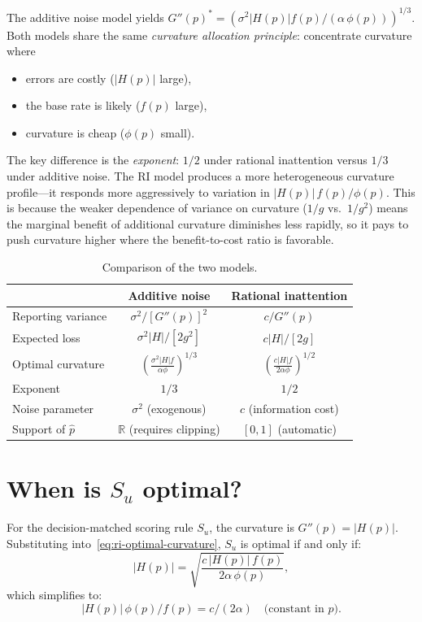 \documentclass[11pt]{article}
\begin{document}
The additive noise model yields $G''(p)^* = ({\sigma^2|H(p)|f(p)}/{(\alpha\,\phi(p))})^{1/3}$. Both models share the same \emph{curvature allocation principle}: concentrate curvature where
\begin{itemize}
\item errors are costly ($|H(p)|$ large),
\item the base rate is likely ($f(p)$ large),
\item curvature is cheap ($\phi(p)$ small).
\end{itemize}
The key difference is the \emph{exponent}: $1/2$ under rational inattention versus $1/3$ under additive noise. The RI model produces a more heterogeneous curvature profile---it responds more aggressively to variation in $|H(p)|\,f(p)/\phi(p)$. This is because the weaker dependence of variance on curvature ($1/g$ vs.\ $1/g^2$) means the marginal benefit of additional curvature diminishes less rapidly, so it pays to push curvature higher where the benefit-to-cost ratio is favorable.

\begin{table}[h]
\centering
\caption{Comparison of the two models.}
\begin{tabular}{l|cc}
& Additive noise & Rational inattention \\
\hline
Reporting variance & $\sigma^2/[G''(p)]^2$ & $c/G''(p)$ \\[4pt]
Expected loss & $\sigma^2|H|/[2g^2]$ & $c|H|/[2g]$ \\[4pt]
Optimal curvature & $\left(\frac{\sigma^2|H|f}{\alpha\phi}\right)^{1/3}$ & $\left(\frac{c|H|f}{2\alpha\phi}\right)^{1/2}$ \\[8pt]
Exponent & $1/3$ & $1/2$ \\[4pt]
Noise parameter & $\sigma^2$ (exogenous) & $c$ (information cost) \\[4pt]
Support of $\hat{p}$ & $\mathbb{R}$ (requires clipping) & $[0,1]$ (automatic) \\
\end{tabular}
\end{table}


\section{When is $S_u$ optimal?}

For the decision-matched scoring rule $S_u$, the curvature is $G''(p) = |H(p)|$. Substituting into~\eqref{eq:ri-optimal-curvature}, $S_u$ is optimal if and only if:
\[
|H(p)| = \sqrt{\frac{c\,|H(p)|\,f(p)}{2\alpha\,\phi(p)}},
\]
which simplifies to:
\begin{equation}\label{eq:ri-Su-condition}
|H(p)|\,\phi(p) / f(p) = c/(2\alpha) \quad \text{(constant in } p\text{)}.
\end{equation}
\end{document}
